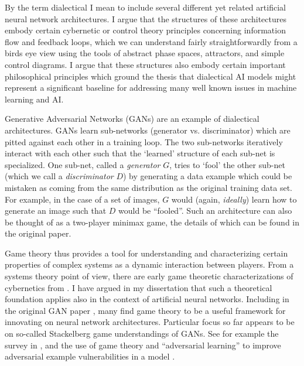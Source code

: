 By the term dialectical I mean to include several different yet related artificial neural network architectures.  I argue that the structures of these architectures embody certain cybernetic or control theory principles concerning information flow and feedback loops, which we can understand fairly straightforwardly from a birds eye view using the tools of abstract phase spaces, attractors, and simple control diagrams.  I argue that these structures also embody certain important philosophical principles which ground the thesis that dialectical AI models might represent a significant baseline for addressing many well known issues in machine learning and AI.



Generative Adversarial Networks (GANs) are an example of dialectical architectures.  GANs learn sub-networks (generator vs. discriminator) which are pitted against each other in a training loop.  The two sub-networks iteratively interact with each other such that the `learned' structure of each sub-net is specialized.  One sub-net, called a \emph{generator} $G$, tries to `fool' the other sub-net (which we call a \emph{discriminator} $D$) by generating a data example which could be mistaken as coming from the same distribution as the original training data set.  For example, in the case of a set of images, $G$ would (again, \emph{ideally}) learn how to generate an image such that $D$ would be ``fooled''.  Such an architecture can also be thought of as a two-player minimax game, the details of which can be found in the original paper.  \citep{GANS2014}


Game theory thus provides a tool for understanding and characterizing certain properties of complex systems as a dynamic interaction between players.  From a systems theory point of view, there are early game theoretic characterizations of cybernetics from \citep{Ashby1958}. I have argued in my dissertation that such a theoretical foundation applies also in the context of artificial neural networks.  \citep{Beebe2021}  Including in the original GAN paper \citep{GANS2014}, many find game theory to be a useful framework for innovating on neural network architectures.  Particular focus so far appears to be on so-called Stackelberg game understandings of GANs.  See for example the survey in \citep{GameTheoryDLSurvey2022}, and the use of game theory and ``adversarial learning'' to improve adversarial example vulnerabilities in a model \citep{AdversarialLearning2021}.




